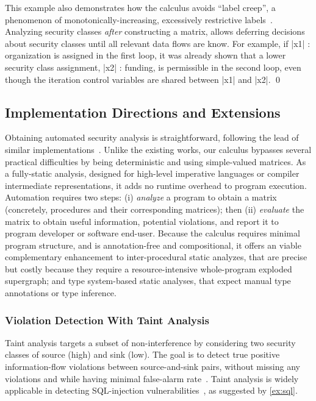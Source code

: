 \begin{example}
This example also demonstrates how the calculus avoids \enquote{label creep}, a phenomenon of monotonically-increasing, excessively restrictive labels~\cite{sabelfeld2003}.
Analyzing security classes \emph{after} constructing a matrix, allows deferring decisions about security classes until all relevant data flows are know.
For example, if \prc|x1| : organization is assigned in the first loop, it was already shown that a lower security class assignment, \prc|x2| : funding, is permissible in the second loop, even though the iteration control variables are shared between \prc|x1| and \prc|x2|.
\qed
\end{example}


\subsection{Implementation Directions and Extensions}
\label{plas-implementation}

Obtaining automated security analysis is straightforward, following the lead of similar implementations~\cite{Aubert2022l,Moyen2017}.
Unlike the existing works, our calculus bypasses several practical difficulties by being deterministic and using simple-valued matrices.
As a fully-static analysis, designed for high-level imperative languages or compiler intermediate representations, it adds no runtime overhead to program execution.
Automation requires two steps:
(i) \emph{analyze} a program to obtain a matrix (concretely, procedures and their corresponding matrices); then
(ii) \emph{evaluate} the matrix to obtain useful information, \eg potential violations, and report it to program developer or software end-user.
Because the calculus requires minimal program structure, and is annotation-free and compositional, it offers an viable complementary enhancement to
\eg inter-procedural static analyzes, that are precise but costly because they require a resource-intensive whole-program exploded supergraph;
and type system-based static analyses, that expect manual type annotations or type inference.


\subsubsection{Violation Detection With Taint Analysis}

Taint analysis targets a subset of non-interference by considering two security classes of source (high) and sink (low).
The goal is to detect true positive information-flow violations between source-and-sink pairs, without missing any violations and while having minimal false-alarm rate~\cite{pauck2018}.
Taint analysis is widely applicable in \eg detecting SQL-injection vulnerabilities~\cite{huang2014}, as suggested by \autoref{ex:sql}.

